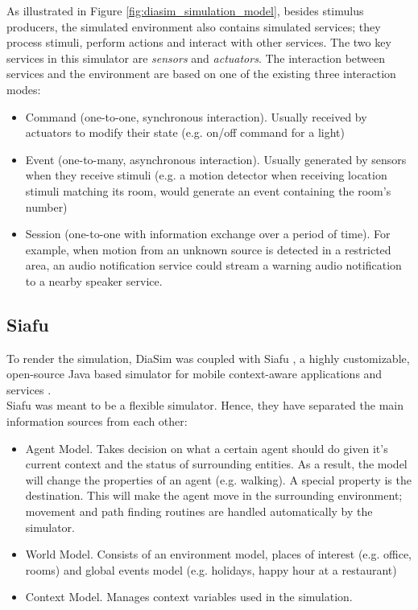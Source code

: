 As illustrated in Figure \ref{fig:diasim_simulation_model}, besides stimulus producers, the simulated environment also contains simulated services; they process stimuli, perform actions and interact with other services. The two key services in this simulator are \emph{sensors} and \emph{actuators}. The interaction between services and the environment are based on one of the existing three interaction modes:
\begin{itemize}
	\item Command (one-to-one, synchronous interaction). Usually received by actuators to modify their state (e.g. on/off command for a light)
	\item Event (one-to-many, asynchronous interaction). Usually generated by sensors when they receive stimuli (e.g. a motion detector when receiving location stimuli matching its room, would generate an event containing the room's number)
	\item Session (one-to-one with information exchange over a period of time). For example, when motion from an unknown source is detected in a restricted area, an audio notification service could stream a warning audio notification to a nearby speaker service.
\end{itemize}

\subsection{Siafu}\label{sub:siafu}
To render the simulation, DiaSim was coupled with Siafu \cite{siafu:online}, a highly customizable, open-source Java based simulator for mobile context-aware applications and services \cite{martin2006generic}.\\

Siafu was meant to be a flexible simulator. Hence, they have separated the main information sources from each other:
\begin{itemize}
	\item Agent Model. Takes decision on what a certain agent should do given it's current context and the status of surrounding entities. As a result, the model will change the properties of an agent (e.g. walking). A special property is the destination. This will make the agent move in the surrounding environment; movement and path finding routines are handled automatically by the simulator.
	\item World Model. Consists of an environment model, places of interest (e.g. office, rooms) and global events model (e.g. holidays, happy hour at a restaurant)
	\item Context Model. Manages context variables used in the simulation.
\end{itemize}

